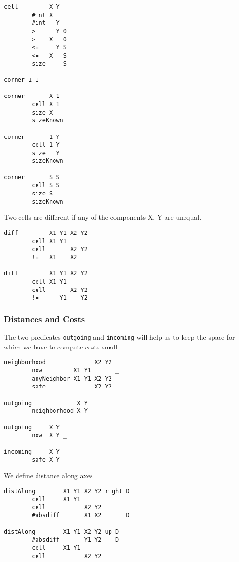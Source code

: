 \begin{verbatim}
cell         X Y
        #int X
        #int   Y
        >      Y 0
        >    X   0
        <=     Y S
        <=   X   S
        size     S

corner 1 1

corner       X 1
        cell X 1
        size X
        sizeKnown

corner       1 Y
        cell 1 Y
        size   Y
        sizeKnown

corner       S S
        cell S S
        size S
        sizeKnown
\end{verbatim}

Two cells are different if any of the components X, Y are unequal.

\begin{verbatim}
diff         X1 Y1 X2 Y2
        cell X1 Y1
        cell       X2 Y2
        !=   X1    X2

diff         X1 Y1 X2 Y2
        cell X1 Y1
        cell       X2 Y2
        !=      Y1    Y2
\end{verbatim}

\hypertarget{distances-and-costs}{%
\subsubsection{Distances and Costs}\label{distances-and-costs}}

The two predicates \texttt{outgoing} and \texttt{incoming} will help us
to keep the space for which we have to compute costs small.

\begin{verbatim}
neighborhood              X2 Y2
        now         X1 Y1       _
        anyNeighbor X1 Y1 X2 Y2
        safe              X2 Y2

outgoing             X Y
        neighborhood X Y

outgoing     X Y
        now  X Y _

incoming     X Y
        safe X Y
\end{verbatim}

We define distance along axes

\begin{verbatim}
distAlong        X1 Y1 X2 Y2 right D
        cell     X1 Y1
        cell           X2 Y2
        #absdiff       X1 X2       D

distAlong        X1 Y1 X2 Y2 up D
        #absdiff       Y1 Y2    D
        cell     X1 Y1
        cell           X2 Y2
\end{verbatim}

